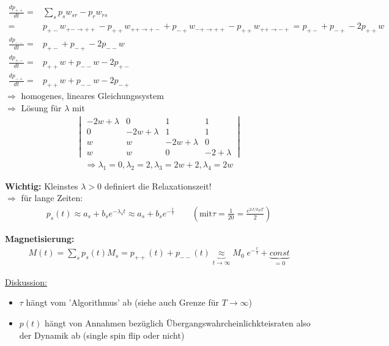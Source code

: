 \documentclass[12pt]{article}
\begin{document}
  \begin{align*}
 \frac{dp_{++}}{dt} =& \sum_s p_s w_{s r} - p_{r} w_{r s} \\
 =& p_{+-} w_{+- \rightarrow ++} - p_{++} w_{++ \rightarrow +-} +
 p_{-+} w_{-+ \rightarrow ++} - p_{++} w_{++ \rightarrow -+} =
 p_{+-} + p_{-+} - 2 p_{++} w \\
 \frac{dp_{--}}{dt}= & p_{+-} + p_{-+} - 2p_{--}w \\
  \frac{dp_{+-}}{dt}= & p_{++}w + p_{--} w- 2p_{+-} \\
   \frac{dp_{-+}}{dt}= & p_{++}w + p_{--}w -2p_{-+}
 \end{align*}
$\Rightarrow$ homogenes, lineares Gleichungssystem \\
$\Rightarrow$ Lösung für $\lambda$ mit 
\begin{align*}
\begin{vmatrix}
-2w+\lambda & 0 & 1 & 1 \\
0 & -2w +\lambda & 1 & 1 \\
w & w & -2w + \lambda & 0 \\
w & w & 0 & -2+\lambda 
\end{vmatrix} 
\end{align*}
\begin{align*}
\Rightarrow \lambda_1=0, \lambda_2=2, \lambda_3=2w+2, \lambda_4=2w \end{align*}

\textbf{Wichtig:} Kleinstes $\lambda >0$ definiert die Relaxationszeit! \\
$\Rightarrow$ für lange Zeiten: 
\begin{align*} p_s(t) \approx a_s + b_s e^{-\lambda_4 t} \approx a_s + b_s e^{-\frac{t}{\tau}} \quad \quad \left(\text{mit} \tau= \frac{1}{20}= \frac{e^{2J/k_BT}}{2} \right)
\end{align*}

\textbf{Magnetisierung:} 
\begin{align}
M(t)= \sum_s p_s(t) M_s = p_{++}(t) + p_{--}(t) \underbrace{\approx}_{t \to \infty} M_0 \; e^{-\frac{t}{\tau}} + \underbrace{const}_{=0}
\end{align}


\underline{Diskussion:} %
\begin{itemize}
\item $\tau$ hängt vom 'Algorithmus' ab (siehe auch Grenze für $T\to \infty $)
\item $p(t)$ hängt von Annahmen bezüglich Übergangswahrcheinlichkteisraten  also der Dynamik ab (single spin flip oder nicht)
\end{itemize}
\end{document}

